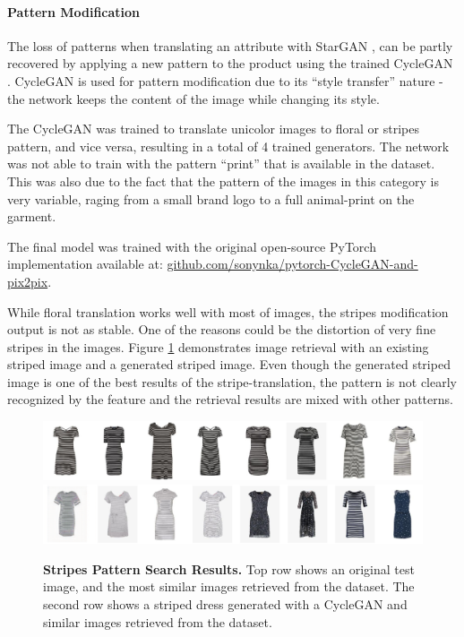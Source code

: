 \documentclass[12pt]{report}
\begin{document}
\paragraph{Pattern Modification}
The loss of patterns when translating an attribute with StarGAN \cite{choi_stargan_2017}, can be partly recovered by applying a new pattern to the product using the trained CycleGAN \cite{zhu_unpaired_2017}. CycleGAN is used for pattern modification due to its ``style transfer'' nature - the network keeps the content of the image while changing its style.

The CycleGAN was trained to translate unicolor images to floral or stripes pattern, and vice versa, resulting in a total of 4 trained generators. The network was not able to train with the pattern ``print'' that is available in the dataset. This was also due to the fact that the pattern of the images in this category is very variable, raging from a small brand logo to a full animal-print on the garment.

The final model was trained with the original open-source PyTorch implementation available at: \hyperlink{https://github.com/sonynka/pytorch-CycleGAN-and-pix2pix}{github.com/sonynka/pytorch-CycleGAN-and-pix2pix}. 

While floral translation works well with most of images, the stripes modification output is not as stable. One of the reasons could be the distortion of very fine stripes in the images.  Figure \ref{fig:stripes_retrieval} demonstrates image retrieval with an existing striped image and a generated striped image. Even though the generated striped image is one of the best results of the stripe-translation, the pattern is not clearly recognized by the feature and the retrieval results are mixed with other patterns.

\begin{figure}[h]
\centering
{\includegraphics[width=\linewidth]{05_results/stripes_orig_results}}
{\includegraphics[width=\linewidth]{05_results/stripes_gen_results}}
\caption{\label{fig:stripes_retrieval} \textbf{Stripes Pattern Search Results.} Top row shows an original test image, and the most similar images retrieved from the dataset. The second row shows a striped dress generated with a CycleGAN and similar images retrieved from the dataset.}
\end{figure}
\end{document}
